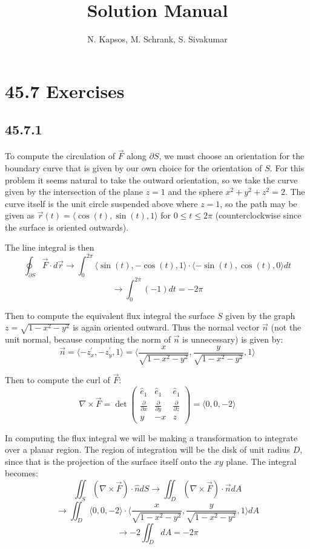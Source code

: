 \documentclass{article}
\title{Solution Manual}
\author{N. Kapsos, M. Schrank, S. Sivakumar}
\date{}
\begin{document}
\maketitle
\setcounter{secnumdepth}{0}

\section{45.7 Exercises}

\subsection{45.7.1}

To compute the circulation of $\vec{F}$ along $\partial S$, we must choose an orientation for the boundary curve that is given by our own choice for the orientation of $S$. For this problem it seems natural to take the outward orientation, so we take the curve given by the intersection of the plane $z=1$ and the sphere $x^2+y^2+z^2 = 2$. The curve itself is the unit circle suspended above where $z=1$, so the path may be given as $\vec{r}(t) = \langle \cos(t), \sin(t) , 1\rangle$ for $0\leq t \leq 2\pi$ (counterclockwise since the surface is oriented outwards).

The line integral is then $$\oint_{\partial S} \vec{F}\cdot d\vec{r} \to \int_{0}^{2\pi}\langle \sin(t), -\cos(t) ,1 \rangle \cdot \langle -\sin(t), \cos(t) ,0 \rangle dt$$
$$ \to \int_0^{2\pi} (-1)dt = -2\pi$$

Then to compute the equivalent flux integral the surface $S$ given by the graph $z = \sqrt{1-x^2-y^2}$ is again oriented outward. Thus the normal vector $\vec{n}$ (not the unit normal, because computing the norm of $\vec{n}$ is unnecessary) is given by:
$$\vec{n} = \langle -z^{\prime}_x, -z^{\prime}_y ,1 \rangle = \bigg\langle \frac{x}{\sqrt{1-x^2-y^2}}, \frac{y}{\sqrt{1-x^2-y^2}} ,1 \bigg\rangle$$

Then to compute the curl of $\vec{F}$:
$$\nabla \times \vec{F} = \det \begin{pmatrix}
    \hat{e}_1 & \hat{e}_1 & \hat{e}_1 \\
    \frac{\partial}{\partial x} & \frac{\partial}{\partial y} & \frac{\partial}{\partial z} \\
    y & -x & z
\end{pmatrix} = \langle 0, 0 ,-2 \rangle$$

In computing the flux integral we will be making a transformation to integrate over a planar region. The region of integration will be the disk of unit radius $D$, since that is the projection of the surface itself onto the $xy$ plane. The integral becomes:
$$\iint_S \left(\nabla\times \vec{F}\right) \cdot \hat{n}dS \to \iint_D \left(\nabla\times \vec{F}\right)\cdot \vec{n}dA$$
$$ \to \iint_D \langle 0, 0 ,-2 \rangle \cdot \bigg\langle \frac{x}{\sqrt{1-x^2-y^2}}, \frac{y}{\sqrt{1-x^2-y^2}} ,1 \bigg\rangle dA$$
$$\to -2\iint_D dA = -2\pi$$
\end{document}
